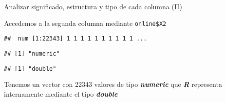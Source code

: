 \documentclass[
  ignorenonframetext,
]{beamer}
\newenvironment{Shaded}{\begin{snugshade}}{\end{snugshade}}
\newcommand{\KeywordTok}[1]{\textcolor[rgb]{0.13,0.29,0.53}{\textbf{#1}}}
\newcommand{\NormalTok}[1]{#1}
\newcommand{\OperatorTok}[1]{\textcolor[rgb]{0.81,0.36,0.00}{\textbf{#1}}}
\begin{document}
\begin{frame}[fragile]{Analizar significado, estructura y tipo de cada
columna (II)}
\protect\hypertarget{analizar-significado-estructura-y-tipo-de-cada-columna-ii}{}

Accedemos a la segunda columna mediante \texttt{online\$X2}

\begin{Shaded}
\end{Shaded}

\begin{verbatim}
##  num [1:22343] 1 1 1 1 1 1 1 1 1 1 ...
\end{verbatim}

\begin{Shaded}
\end{Shaded}

\begin{verbatim}
## [1] "numeric"
\end{verbatim}

\begin{Shaded}
\end{Shaded}

\begin{verbatim}
## [1] "double"
\end{verbatim}

Tenemos un vector con 22343 valores de tipo \textbf{\emph{numeric}} que
\textbf{\emph{R}} representa internamente mediante el tipo
\textbf{\emph{double}}

\end{frame}
\end{document}
